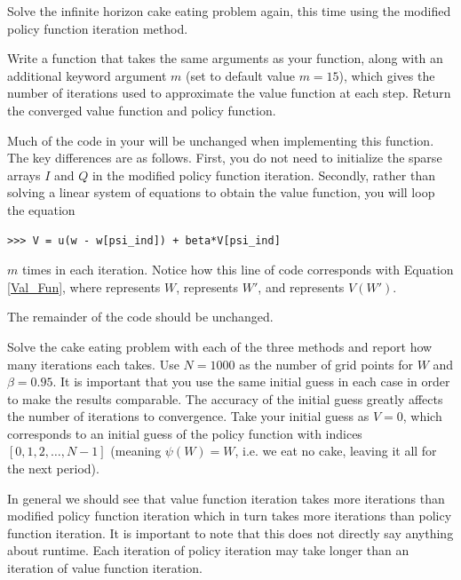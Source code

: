 \begin{problem}
Solve the infinite horizon cake eating problem again, this time using the modified policy function
iteration method.

Write a function  that takes the same arguments as your  function, along
with an additional keyword argument $m$ (set to default value $m=15$), which gives the number of iterations used
to approximate the value function at each step. Return the converged value function and policy function. 

Much of the code in your  will be unchanged when implementing this function. The key differences are
as follows.
First, you do not need to initialize the sparse arrays $I$ and $Q$ in the modified policy function iteration.
Secondly, rather than solving a linear system of equations to obtain the value function, you will loop
the equation
\begin{lstlisting}
>>> V = u(w - w[psi_ind]) + beta*V[psi_ind]
\end{lstlisting}
$m$ times in each iteration. Notice how this line of code corresponds with Equation \eqref{Val_Fun}, where
 represents $W$,  represents $W'$, and  represents $V(W')$.

The remainder of the code should be unchanged.


\end{problem}

\begin{problem}
Solve the cake eating problem with each of the three methods and report how many iterations each takes.  Use $N= 1000$ as the
number of grid points for $W$ and $\beta = 0.95$.  It is important that you use the same initial guess in each case in order to
make the results comparable.  The accuracy of the initial guess greatly affects the number of iterations to convergence.  Take
your initial guess as $V = 0$, which corresponds to an initial guess of the policy function with indices $[0,1,2,\ldots, N-1]$
(meaning $\psi(W) = W$, i.e. we eat no cake, leaving it all for the next period).
\end{problem}

In general we should see that value function iteration takes more iterations than modified policy function iteration which in turn
takes more iterations than policy function iteration.  It is important to note that this does not directly say anything about runtime.
Each iteration of policy iteration may take longer than an iteration of value function iteration.

